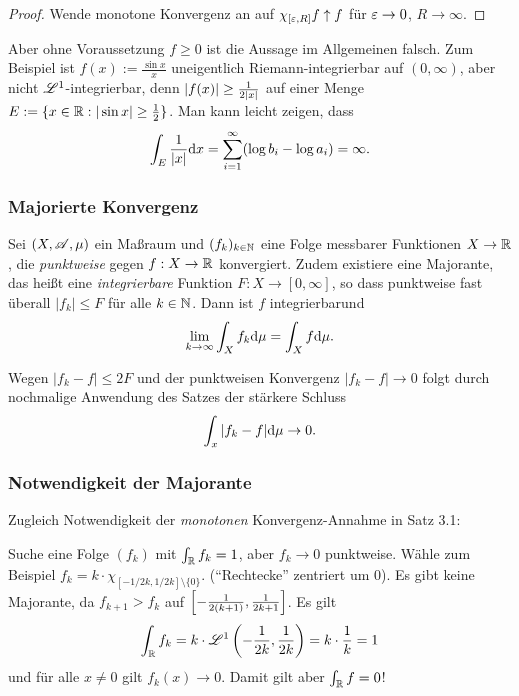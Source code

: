 \begin{proof}
 Wende monotone Konvergenz an auf $\chi_{[\varepsilon,R]} f \uparrow f$ für $\varepsilon \to 0$, $R \to \infty$.
\end{proof}

Aber ohne Voraussetzung $f \ge 0$ ist die Aussage im Allgemeinen falsch. Zum Beispiel ist $f(x) := \frac{\sin x}{x}$ uneigentlich Riemann-integrierbar auf $(0,\infty)$, aber nicht $\mathscr{L}^1$-integrierbar, denn $|f(x)| \ge \frac{1}{2 |x|}$ auf einer Menge $E := \{ x \in \mathbb{R}: |\sin x| \ge \frac{1}{2} \}$. Man kann leicht zeigen, dass
\[ \int_E \frac{1}{|x|} \mathrm{d} x = \sum_{i=1}^\infty ( \log b_i - \log a_i ) = \infty. \]

\subsubsection{Majorierte Konvergenz}
\begin{thm}
 Sei $(X, \mathscr{A}, \mu)$ ein Maßraum und $(f_k)_{k \in \mathbb{N}}$ eine Folge messbarer Funktionen $X \to \mathbb{R}$, die \emph{punktweise} gegen $f:X \to \mathbb{R}$ konvergiert. Zudem existiere eine Majorante, das heißt eine \emph{integrierbare} Funktion $F: X \to [0, \infty]$, so dass punktweise fast überall $|f_k| \le F$ für alle $k \in \mathbb{N}$. Dann ist $f$ integrierbar\footnotemark und
 \[ \lim_{k \to \infty} \int_X f_k \mathrm{d} \mu = \int_X f \mathrm{d} \mu. \]
\end{thm}

\begin{rmrk}
 Wegen $|f_k -f| \le 2F$ und der punktweisen Konvergenz $|f_k - f| \to 0$ folgt durch nochmalige Anwendung des Satzes der stärkere Schluss
 \[ \int_x |f_k - f| \mathrm{d} \mu \to 0. \]
\end{rmrk}

\subsubsection*{Notwendigkeit der Majorante}
Zugleich Notwendigkeit der \emph{monotonen} Konvergenz-Annahme in Satz 3.1:

Suche eine Folge $(f_k)$ mit $\int_{\mathbb{R}} f_k = 1$, aber $f_k \to 0$ punktweise. Wähle zum Beispiel $f_k = k \cdot \chi_{[-1/2k,1/2k]\setminus \{ 0 \}}$. (``Rechtecke'' zentriert um 0). Es gibt keine Majorante, da $f_{k+1} > f_k$ auf $\left[ -\frac{1}{2(k+1)}, \frac{1}{2k+1} \right]$. Es gilt
\[ \int_{\mathbb{R}} f_k = k \cdot \mathscr{L}^1 \left( -\frac{1}{2k}, \frac{1}{2k} \right) = k \cdot \frac{1}{k} = 1 \]
und für alle $x \ne 0$ gilt $f_k(x) \to 0$. Damit gilt aber $\int_{\mathbb{R}} f = 0$!

